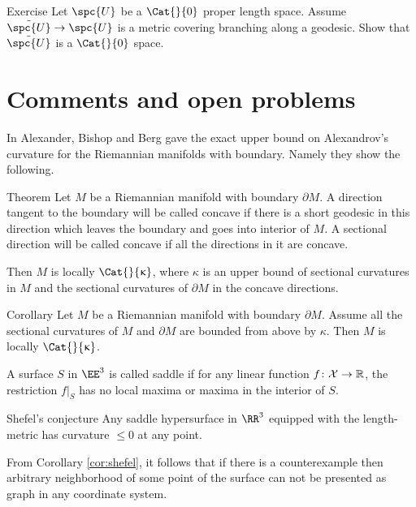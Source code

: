 \begin{thm}{Exercise}\label{ex:branching-cover} 
Let $\spc{U}$ be a $\Cat{}{0}$ proper length space.
Assume $\tilde{\spc{U}}\to \spc{U}$ is a metric covering branching along a geodesic.
Show that $\tilde{\spc{U}}$ is a $\Cat{}{0}$ space.
\end{thm}







\section{Comments and open problems}

In \cite{a-b-b:CBA-m-w-b} Alexander, Bishop and Berg gave the exact upper bound on Alexandrov's curvature for the Riemannian manifolds with boundary.
Namely they show the following.

\begin{thm}{Theorem}
Let $M$ be a Riemannian manifold with boundary $\partial M$.
A direction tangent to the boundary will be called concave if there is a short geodesic in this direction which leaves the boundary and goes into interior of $M$.
A sectional direction will be called concave if all the directions in it are concave.

Then $M$ is locally $\Cat{}{\kappa}$, where $\kappa$ is an upper bound of sectional curvatures in $M$ and the sectional curvatures of $\partial M$ in the concave directions.
\end{thm}

\begin{thm}{Corollary}
Let $M$ be a Riemannian manifold with boundary $\partial M$. 
Assume all the sectional curvatures of $M$ and $\partial M$ are bounded from above by $\kappa$.
Then $M$ is locally $\Cat{}{\kappa}$.
\end{thm}


A surface $S$ in $\EE^3$ is called saddle if for any linear function $f\:\spc{X}\to\RR$,
the restriction $f|_S$ has no local maxima or maxima in the interior of $S$.

\begin{thm}{Shefel's conjecture}
Any saddle hypersurface in $\RR^3$ equipped with the length-metric has curvature $\le 0$ at any point.
\end{thm} 

From Corollary \ref{cor:shefel}, it follows that if there is a counterexample then arbitrary neighborhood of some point of the surface can not be presented as graph in any coordinate system.


